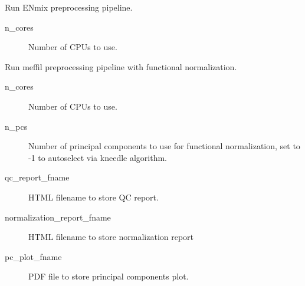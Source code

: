 \documentclass[letterpaper,10pt,english]{sphinxmanual}
\begin{document}
\begin{fulllineitems}

\begin{fulllineitems}
\label{\detokenize{index:pymethylprocess.PreProcessDataTypes.PreProcessIDAT.preprocessENmix}}
Run ENmix preprocessing pipeline.
\begin{description}
\item[{n\_cores}] \leavevmode
Number of CPUs to use.

\end{description}

\end{fulllineitems}


\begin{fulllineitems}
\label{\detokenize{index:pymethylprocess.PreProcessDataTypes.PreProcessIDAT.preprocessMeffil}}
Run meffil preprocessing pipeline with functional normalization.
\begin{description}
\item[{n\_cores}] \leavevmode
Number of CPUs to use.

\item[{n\_pcs}] \leavevmode
Number of principal components to use for functional normalization, set to -1 to autoselect via kneedle algorithm.

\item[{qc\_report\_fname}] \leavevmode
HTML filename to store QC report.

\item[{normalization\_report\_fname}] \leavevmode
HTML filename to store normalization report

\item[{pc\_plot\_fname}] \leavevmode
PDF file to store principal components plot.


\end{description}
\end{fulllineitems}
\end{fulllineitems}
\end{document}
